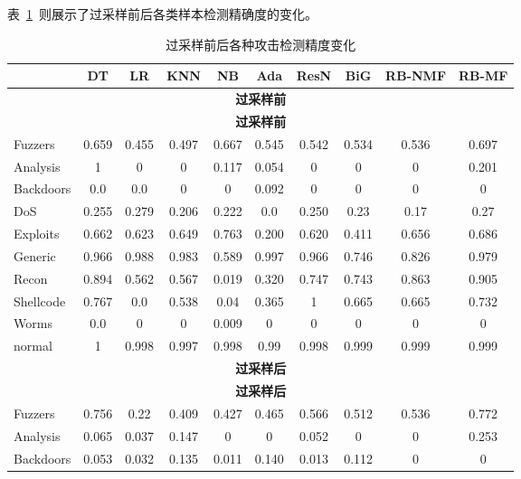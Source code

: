 表~\ref{tab:oversampling_performance}~则展示了过采样前后各类样本检测精确度的变化。
\begin{table}[htbp]
	\centering
	\caption{过采样前后各种攻击检测精度变化}
	\label{tab:oversampling_performance}
	\begin{tabular}{lccccccccc}
		\toprule
		          & DT    & LR    & KNN   & NB    & Ada   & ResN  & BiG   & RB-NMF & RB-MF \\
		\midrule
		\multicolumn{10}{c}{\textbf{过采样前}}                                             \\
		\multicolumn{10}{c}{\textbf{过采样前}}                                             \\
		Fuzzers   & 0.659 & 0.455 & 0.497 & 0.667 & 0.545 & 0.542 & 0.534 & 0.536  & 0.697 \\
		Analysis  & 1     & 0     & 0     & 0.117 & 0.054 & 0     & 0     & 0      & 0.201 \\
		Backdoors & 0.0   & 0.0   & 0     & 0     & 0.092 & 0     & 0     & 0      & 0     \\
		DoS       & 0.255 & 0.279 & 0.206 & 0.222 & 0.0   & 0.250 & 0.23  & 0.17   & 0.27  \\
		Exploits  & 0.662 & 0.623 & 0.649 & 0.763 & 0.200 & 0.620 & 0.411 & 0.656  & 0.686 \\
		Generic   & 0.966 & 0.988 & 0.983 & 0.589 & 0.997 & 0.966 & 0.746 & 0.826  & 0.979 \\
		Recon     & 0.894 & 0.562 & 0.567 & 0.019 & 0.320 & 0.747 & 0.743 & 0.863  & 0.905 \\
		Shellcode & 0.767 & 0.0   & 0.538 & 0.04  & 0.365 & 1     & 0.665 & 0.665  & 0.732 \\
		Worms     & 0.0   & 0     & 0     & 0.009 & 0     & 0     & 0     & 0      & 0     \\
		normal    & 1     & 0.998 & 0.997 & 0.998 & 0.99  & 0.998 & 0.999 & 0.999  & 0.999 \\
		\midrule
		\multicolumn{10}{c}{\textbf{过采样后}}                                             \\
		\multicolumn{10}{c}{\textbf{过采样后}}                                             \\
		Fuzzers   & 0.756 & 0.22  & 0.409 & 0.427 & 0.465 & 0.566 & 0.512 & 0.536  & 0.772 \\
		Analysis  & 0.065 & 0.037 & 0.147 & 0     & 0     & 0.052 & 0     & 0      & 0.253 \\
		Backdoors & 0.053 & 0.032 & 0.135 & 0.011 & 0.140 & 0.013 & 0.112 & 0      & 0     \\

\end{tabular}
\end{table}
